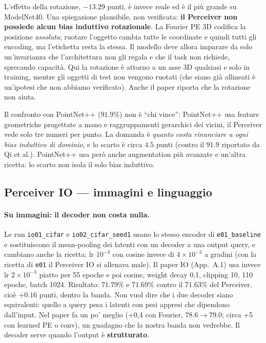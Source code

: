 \documentclass[
  11pt,
]{article}
\begin{document}
L'effetto della rotazione, $-13.29$ punti, è invece reale ed è il più grande su ModelNet40. Una spiegazione plausibile, non verificata: \textbf{il Perceiver non possiede alcun bias induttivo rotazionale}. La Fourier PE 3D codifica la posizione \emph{assoluta}; ruotare l'oggetto cambia tutte le coordinate e quindi tutti gli encoding, ma l'etichetta resta la stessa. Il modello deve allora imparare da solo un'invarianza che l'architettura non gli regala e che il task non richiede, sprecando capacità. Qui la rotazione è attorno a un asse 3D qualsiasi e solo in training, mentre gli oggetti di test non vengono ruotati (che siano già allineati è un'ipotesi che non abbiamo verificato). Anche il paper riporta che la rotazione non aiuta.

Il confronto con PointNet++ ($91.9\%$) non è ``chi vince'': PointNet++ usa feature geometriche progettate a mano e raggruppamenti gerarchici dei vicini, il Perceiver vede solo tre numeri per punto. La domanda è \emph{quanto costa rinunciare a ogni bias induttivo di dominio}, e lo scarto è circa $4.5$ punti (contro il $91.9$ riportato da Qi et al.). PointNet++ usa però anche augmentation più avanzate e un'altra ricetta: lo scarto non isola il solo bias induttivo.

\subsection{Perceiver IO --- immagini e linguaggio}
\label{sec:progetto-io}

\paragraph{Su immagini: il decoder non costa nulla.} Le run \texttt{io01\_cifar} e \texttt{io02\_cifar\_seed1} usano lo stesso encoder di \texttt{e01\_baseline} e sostituiscono il mean-pooling dei latenti con un decoder a una output query, e cambiano anche la ricetta: lr $10^{-3}$ con cosine invece di $4\times10^{-3}$ a gradini (con la ricetta di \texttt{e01} il Perceiver IO si allenava male). Il paper IO (App.~A.1) usa invece lr $2\times10^{-3}$ piatto per 55 epoche e poi cosine, weight decay 0,1, clipping 10, 110 epoche, batch 1024. Risultato: $71.79\%$ e $71.69\%$ contro il $71.63\%$ del Perceiver, cioè $+0.16$ punti, dentro la banda. Non vuol dire che i due decoder siano equivalenti: quello a query pesa i latenti con pesi appresi che dipendono dall'input. Nel paper fa un po' meglio (+0,4 con Fourier, $78.6 \to 79.0$; circa +5 con learned PE o conv), un guadagno che la nostra banda non vedrebbe. Il decoder serve quando l'output è \textbf{strutturato}.
\end{document}
